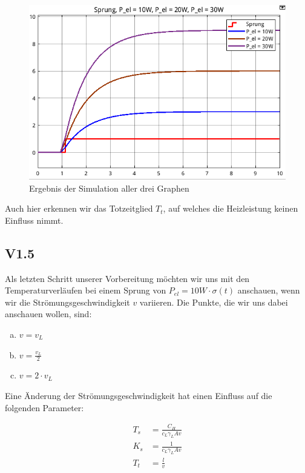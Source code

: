 \documentclass{report}
\begin{document}
\begin{figure}[h]
  \centering
  \includegraphics[width=\textwidth]{../assets/images/RTP/rtp_1_V14_2.png}
  \caption{Ergebnis der Simulation aller drei Graphen}
  \label{fig:rtp1v14_2}
\end{figure}

Auch hier erkennen wir das Totzeitglied $T_{t}$, auf welches die Heizleistung keinen Einfluss nimmt.

\newpage

\subsection{V1.5}

Als letzten Schritt unserer Vorbereitung möchten wir uns mit den Temperaturverläufen bei einem Sprung von $P_{el} = 10W\cdot \sigma(t)$ anschauen, wenn wir die Strömungsgeschwindigkeit $v$ variieren. Die Punkte, die wir uns dabei anschauen wollen, sind:

\begin{enumerate}[a)]
   \item $v = v_{L}$
   \item $v = \frac{v_{L}}{2}$
   \item $v = 2 \cdot v_{L}$
\end{enumerate}

Eine Änderung der Strömungsgeschwindigkeit hat einen Einfluss auf die folgenden Parameter:

\begin{align*}
  \label{eq:10}
  T_{s} &= \frac{C_{H}}{c_{L}\gamma_{L}Av}\\
  K_{s} &= \frac{1}{c_{L}\gamma_{L}Av}\\
  T_{t} &= \frac{l}{v}
\end{align*}
\end{document}
